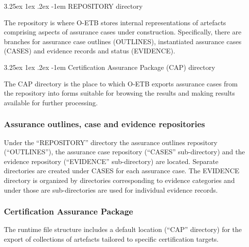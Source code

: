 \documentclass[12pt,twoside,a4paper]{article}
\makeatletter
\renewcommand\paragraph{\@startsection{paragraph}{5}{\z@}%
  {3.25ex \@plus1ex \@minus.2ex}%
  {-1em}%
  {\normalfont\normalsize\bfseries}}
\makeatother
\begin{document}
\hypertarget{REPO-directory}{%
\paragraph{REPOSITORY directory}\label{REPO-directory}}

The repository is where O-ETB stores internal representations of artefacts comprising aspects of assurance cases under construction.
Specifically, there are branches for assurance case outlines (OUTLINES), instantiated assurance cases (CASES) and evidence records and status (EVIDENCE).



\hypertarget{CAP-directory}{%
\paragraph{Certification Assurance Package (CAP) directory}\label{CAP-directory}}

The CAP directory is the place to which O-ETB exports assurance cases from the repository into forms suitable for browsing the results and making results available for further processing.



\hypertarget{assurance-case-and-evidence-repositories}{%
\subsubsection{Assurance outlines, case and evidence repositories}\label{assurance-case-and-evidence-repositories}}

Under the ``REPOSITORY'' directory the assurance outlines repository (``OUTLINES''), the assurance case repository (``CASES'' sub-directory) and the evidence repository (``EVIDENCE'' sub-directory) are located. Separate directories are created under CASES for each assurance case. The EVIDENCE directory is organized by directories corresponding to evidence categories and under those are sub-directories are used for individual evidence records.

\hypertarget{certification-assurance-package}{%
\subsubsection{Certification Assurance Package}\label{certification-assurance-package}}

The runtime file structure includes a default location (``CAP'' directory) for the export of collections of artefacts tailored to specific certification targets.
\end{document}
